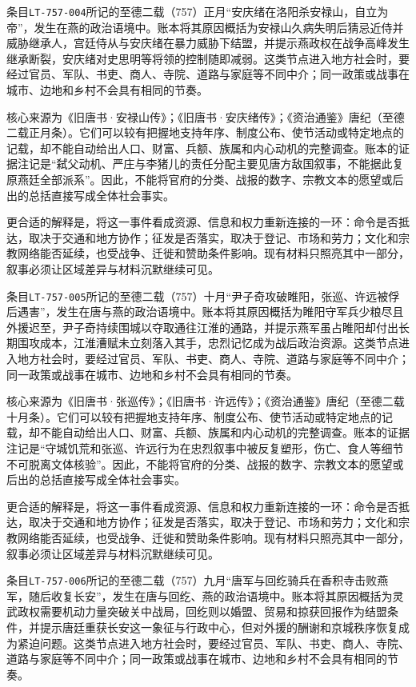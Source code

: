 条目\texttt{LT-757-004}所记的至德二载（757）正月“安庆绪在洛阳杀安禄山，自立为帝”，发生在燕的政治语境中。账本将其原因概括为安禄山久病失明后猜忌近侍并威胁继承人，宫廷侍从与安庆绪在暴力威胁下结盟，并提示燕政权在战争高峰发生继承断裂，安庆绪对史思明等将领的控制随即减弱。这类节点进入地方社会时，要经过官员、军队、书吏、商人、寺院、道路与家庭等不同中介；同一政策或战事在城市、边地和乡村不会具有相同的节奏。

核心来源为《旧唐书·安禄山传》；《旧唐书·安庆绪传》；《资治通鉴》唐纪（至德二载正月条）。它们可以较有把握地支持年序、制度公布、使节活动或特定地点的记载，却不能自动给出人口、财富、兵额、族属和内心动机的完整调查。账本的证据注记是“弑父动机、严庄与李猪儿的责任分配主要见唐方敌国叙事，不能据此复原燕廷全部派系”。因此，不能将官府的分类、战报的数字、宗教文本的愿望或后出的总括直接写成全体社会事实。

更合适的解释是，将这一事件看成资源、信息和权力重新连接的一环：命令是否抵达，取决于交通和地方协作；征发是否落实，取决于登记、市场和劳力；文化和宗教网络能否延续，也受战争、迁徙和赞助条件影响。现有材料只照亮其中一部分，叙事必须让区域差异与材料沉默继续可见。

条目\texttt{LT-757-005}所记的至德二载（757）十月“尹子奇攻破睢阳，张巡、许远被俘后遇害”，发生在唐与燕的政治语境中。账本将其原因概括为睢阳守军兵少粮尽且外援迟至，尹子奇持续围城以夺取通往江淮的通路，并提示燕军虽占睢阳却付出长期围攻成本，江淮漕赋未立刻落入其手，忠烈记忆成为战后政治资源。这类节点进入地方社会时，要经过官员、军队、书吏、商人、寺院、道路与家庭等不同中介；同一政策或战事在城市、边地和乡村不会具有相同的节奏。

核心来源为《旧唐书·张巡传》；《旧唐书·许远传》；《资治通鉴》唐纪（至德二载十月条）。它们可以较有把握地支持年序、制度公布、使节活动或特定地点的记载，却不能自动给出人口、财富、兵额、族属和内心动机的完整调查。账本的证据注记是“守城饥荒和张巡、许远行为在忠烈叙事中被反复塑形，伤亡、食人等细节不可脱离文体核验”。因此，不能将官府的分类、战报的数字、宗教文本的愿望或后出的总括直接写成全体社会事实。

更合适的解释是，将这一事件看成资源、信息和权力重新连接的一环：命令是否抵达，取决于交通和地方协作；征发是否落实，取决于登记、市场和劳力；文化和宗教网络能否延续，也受战争、迁徙和赞助条件影响。现有材料只照亮其中一部分，叙事必须让区域差异与材料沉默继续可见。

条目\texttt{LT-757-006}所记的至德二载（757）九月“唐军与回纥骑兵在香积寺击败燕军，随后收复长安”，发生在唐与回纥、燕的政治语境中。账本将其原因概括为灵武政权需要机动力量突破关中战局，回纥则以婚盟、贸易和掠获回报作为结盟条件，并提示唐廷重获长安这一象征与行政中心，但对外援的酬谢和京城秩序恢复成为紧迫问题。这类节点进入地方社会时，要经过官员、军队、书吏、商人、寺院、道路与家庭等不同中介；同一政策或战事在城市、边地和乡村不会具有相同的节奏。

